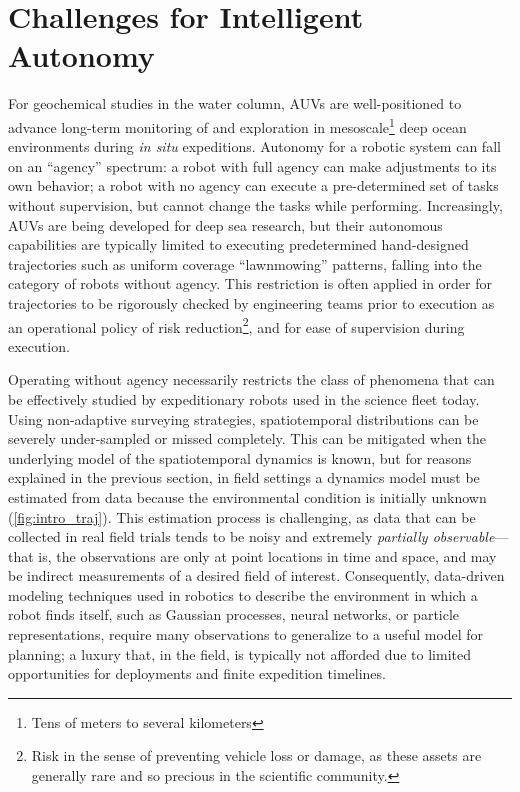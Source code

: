 \section{Challenges for Intelligent Autonomy}
For geochemical studies in the water column, AUVs are well-positioned to advance long-term monitoring of and exploration in mesoscale\footnote{Tens of meters to several kilometers} deep ocean environments during \emph{in situ} expeditions.
Autonomy for a robotic system can fall on an ``agency'' spectrum: a robot with full agency can make adjustments to its own behavior; a robot with no agency can execute a pre-determined set of tasks without supervision, but cannot change the tasks while performing.
Increasingly, AUVs are being developed for deep sea research\autocite{kaiser2016design,yuh2000design,okamoto2019visual,maki2014auv}, but their autonomous capabilities are typically limited to executing predetermined hand-designed trajectories such as uniform coverage ``lawnmowing'' patterns\autocite{camilli2010tracking}, falling into the category of robots without agency.
This restriction is often applied in order for trajectories to be rigorously checked by engineering teams prior to execution as an operational policy of risk reduction\footnote{Risk in the sense of preventing vehicle loss or damage, as these assets are generally rare and so precious in the scientific community.}, and for ease of supervision during execution.

Operating without agency necessarily restricts the class of phenomena that can be effectively studied by expeditionary robots used in the science fleet today.
Using non-adaptive surveying strategies, spatiotemporal distributions can be severely under-sampled or missed completely\autocite{flaspohler2019information, preston2019adaptive}.
This can be mitigated when the underlying model of the spatiotemporal dynamics is known, but for reasons explained in the previous section, in field settings a dynamics model must be estimated from data because the environmental condition is initially unknown (\cref{fig:intro_traj}).
This estimation process is challenging, as data that can be collected in real field trials tends to be noisy and extremely \emph{partially observable}---that is, the observations are only at point locations in time and space, and may be indirect measurements of a desired field of interest. 
Consequently, data-driven modeling techniques used in robotics to describe the environment in which a robot finds itself, such as Gaussian processes\autocite{Rasmussen2004}, neural networks\autocite{cohn1994neural,wang2017predrnn}, or particle representations\autocite{Silver2010}, require many observations to generalize to a useful model for planning; a luxury that, in the field, is typically not afforded due to limited opportunities for deployments and finite expedition timelines.


